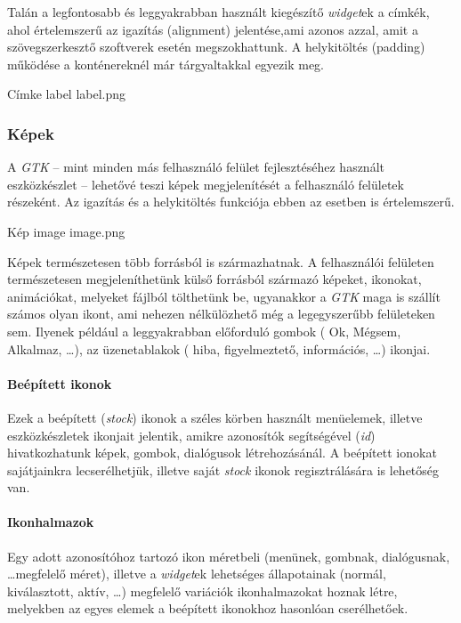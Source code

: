 Talán a legfontosabb és leggyakrabban használt kiegészítő \textit{widget}ek a címkék, ahol értelemszerű az igazítás (alignment) jelentése,ami azonos azzal, amit a szövegszerkesztő szoftverek esetén megszokhattunk. A helykitöltés (padding) működése a konténereknél már tárgyaltakkal egyezik meg.

{Címke}
{label}
{label.png}

\subsubsection{Képek}

A \textit{GTK} -- mint minden más felhasználó felület fejlesztéséhez használt eszközkészlet -- lehetővé teszi képek megjelenítését a felhasználó felületek részeként. Az igazítás és a helykitöltés funkciója ebben az esetben is értelemszerű.

{Kép}
{image}
{image.png}

Képek természetesen több forrásból is származhatnak. A felhasználói felületen természetesen megjeleníthetünk külső forrásból származó képeket, ikonokat, animációkat, melyeket fájlból tölthetünk be, ugyanakkor a \textit{GTK} maga is szállít számos olyan ikont, ami nehezen nélkülözhető még a legegyszerűbb felületeken sem. Ilyenek például a leggyakrabban előforduló gombok ( Ok, Mégsem, Alkalmaz, \dots ), az üzenetablakok ( hiba, figyelmeztető, információs, \dots ) ikonjai.

\paragraph{Beépített ikonok}

Ezek a beépített (\textit{stock}) ikonok a széles körben használt menüelemek, illetve eszközkészletek ikonjait jelentik, amikre azonosítók segítségével (\textit{id}) hivatkozhatunk képek, gombok, dialógusok létrehozásánál. A beépített ionokat sajátjainkra lecserélhetjük, illetve saját \textit{stock} ikonok regisztrálására is lehetőség van.

\paragraph{Ikonhalmazok}

Egy adott azonosítóhoz tartozó ikon méretbeli (menünek, gombnak, dialógusnak, \dots megfelelő méret), illetve a \textit{widget}ek lehetséges állapotainak (normál, kiválasztott, aktív,  \dots ) megfelelő variációk ikonhalmazokat hoznak létre, melyekben az egyes elemek a beépített ikonokhoz hasonlóan cserélhetőek.

